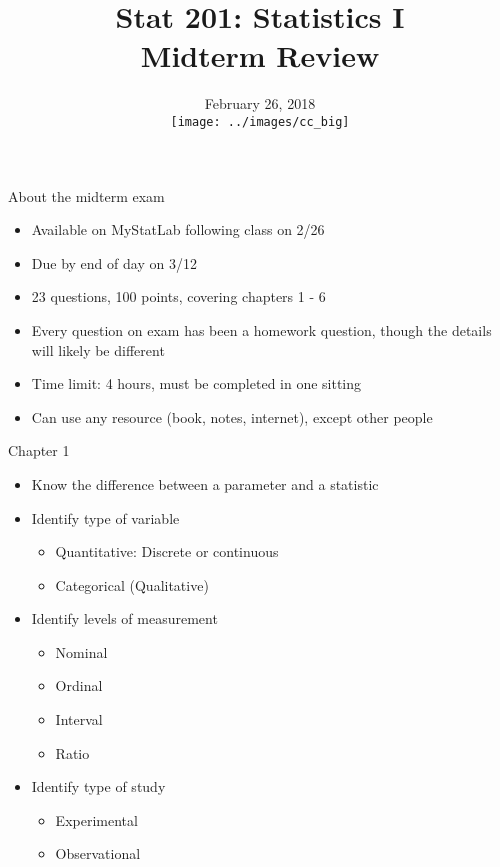 \documentclass[xcolor=table]{beamer}
\title[Midterm Review]{Stat 201: Statistics I\\Midterm Review}
\author[M. Shyne]{}
\institute[Metro State]{\texttt{[image: ../images/metro\_logo]}}
\date[Feb 26, 2018]{February 26, 2018
\\ \bigskip \bigskip \texttt{[image: ../images/cc\_big]}}
\begin{document}
\frame{\titlepage}

\begin{frame}{About the midterm exam}
\begin{block}{}
\begin{itemize}
\item Available on MyStatLab following class on 2/26
\item Due by end of day on 3/12
\item 23 questions, 100 points, covering chapters 1 - 6
\item Every question on exam has been a homework question, though the details will likely be different
\item Time limit: 4 hours, must be completed in one sitting
\item Can use any resource (book, notes, internet), except other people
\end{itemize}
\end{block}
\end{frame}

\begin{frame}{Chapter 1}
\begin{block}{}
\large
\begin{itemize}
\item Know the difference between a parameter and a statistic
\item Identify type of variable
\begin{itemize}
\item Quantitative: Discrete or continuous
\item Categorical (Qualitative)
\end{itemize}
\item Identify levels of measurement
\begin{itemize}
\item Nominal
\item Ordinal
\item Interval
\item Ratio
\end{itemize}
\item Identify type of study
\begin{itemize}
\item Experimental
\item Observational
\end{itemize}
\end{itemize}
\end{block}

\end{frame}
\end{document}
